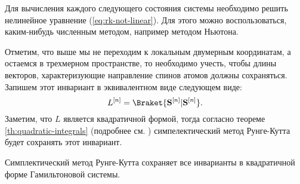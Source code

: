 Для вычисления каждого следующего состояния системы необходимо решить
нелинейное уравнение (\ref{eq:rk-not-linear}). Для этого можно воспользоваться,
каким-нибудь численным методом, например методом Ньютона.

Отметим, что выше мы не переходим к локальным двумерным координатам, а остаемся
в трехмерном пространстве, то необходимо учесть, чтобы длины векторов,
характеризующие направление спинов атомов должны сохраняться. Запишем этот
инвариант в эквивалентном виде следующем виде:
\begin{equation}
    L^{[n]} = \Braket{\Sn | \Sn}.
\end{equation}
Заметим, что $L$ является квадратичной формой, тогда согласно теореме
\ref{th:quadratic-integrals} (подробнее см. \cite{rk-schemes-for-ham-sys})
симпелектический метод Рунге-Кутта будет сохранять
этот инвариант.
\begin{theorem}\label{th:quadratic-integrals}
    Симплектический метод Рунге-Кутта сохраняет все инварианты в квадратичной
    форме Гамильтоновой системы.
\end{theorem}
